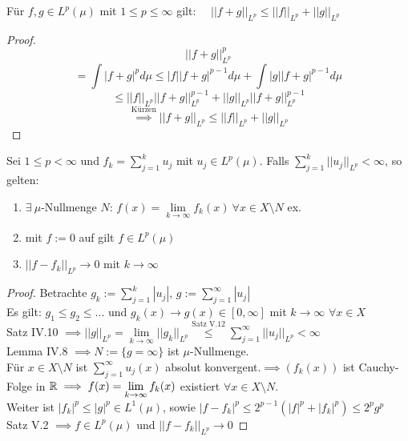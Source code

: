   \begin{theorem}
    Für $f,g \in L^p(\mu)$ mit $1 \leq p \leq \infty$ gilt: \ \ $|| f+g ||_{L^p} \leq ||f||_{L^p} + ||g||_{L^p}$
  \end{theorem}

  \begin{proof}
    $$ ||f+g||^p_{L^p}$$ $$= \int |f+g|^p d\mu \leq |f| |f+g|^{p-1} d\mu + \int |g| |f+g|^{p-1}d\mu$$ $$\leq ||f||_{L^p}||f+g||_{L^p}^{p-1} + ||g||_{L^p}||f+g||_{L^p}^{p-1}$$ $$ \overset{\text{Kürzen}}{\implies} ||f+g||_{L^p} \leq ||f||_{L^p} + ||g||_{L^p}$$
  \end{proof}

  \begin{lemma}
    Sei $1 \leq p < \infty$ und $f_k = \sum\limits_{j=1}^k u_j$ mit $u_j \in L^p(\mu)$. Falls $\sum\limits_{j=1}^k ||u_j||_{L^p} < \infty$, so gelten:
    \begin{enumerate}[label=\roman*)]
      \item $\exists \ \mu$-Nullmenge $N$: $f(x) = \lim\limits_{k \to \infty} f_k(x) \ \forall x \in X \setminus N$ ex.
      \item mit $f := 0$ auf gilt $f \in L^p(\mu)$
      \item $||f - f_k||_{L^p} \to 0$ mit $k \to \infty$
    \end{enumerate}
  \end{lemma}

  \begin{proof}
    Betrachte $g_k := \sum\limits_{j=1}^k |u_j|$, $g:= \sum\limits_{j=1}^\infty |u_j|$ \\
    Es gilt: $g_1 \leq g_2 \leq ...$ und $g_k(x) \to g(x) \in [0,\infty]$ mit $k\to\infty$ $\forall x\in X$ \\
    Satz IV.10 $\implies ||g||_{L^p} = \lim\limits_{k\to\infty} ||g_k||_{L^p} \overset{\text{Satz V.12}}{\leq} \sum\limits_{j=1}^\infty ||u_j||_{L^p} < \infty$ \\
    Lemma IV.8 $\implies N:=\{g=\infty \}$ ist $\mu$-Nullmenge. \\ Für $x\in X\setminus N$ ist $\sum\limits_{j=1}^\infty u_j(x)$ absolut konvergent.$\implies (f_k(x))$ ist Cauchy-Folge in $\mathbb{R} \\
    \implies f(x) = \lim\limits_{k\to\infty} f_k(x)$ existiert $\forall x\in X\setminus N$. \\ Weiter ist $|f_k|^p \leq |g|^p \in L^1(\mu)$, sowie $|f-f_k|^p \leq 2^{p-1}(|f|^p+|f_k|^p) \leq 2^p g^p$ \\
    Satz V.2 $\implies f\in L^p(\mu)$ und $||f-f_k||_{L^p} \to 0$
  \end{proof}

